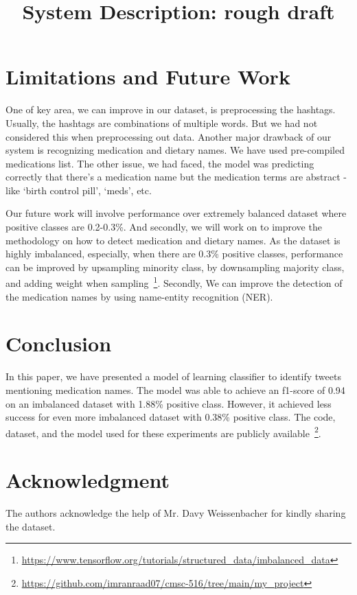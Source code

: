 \documentclass[12pt, onecolumn, conference]{IEEEtran}
\begin{document}
	
	\title{System Description: rough draft}
	
	\author{
	}
	
	\maketitle
	
	
	
	
	
	

	
		
	\section{Limitations and Future Work}
	One of key area, we can improve in our dataset, is preprocessing the hashtags. Usually, the hashtags are combinations of multiple words. But we had not considered this when preprocessing out data. Another major drawback of our system is recognizing medication and dietary names. We have used pre-compiled medications list. The other issue, we had faced, the model was predicting correctly that there's a medication name but the medication terms are abstract - like `birth control pill', `meds', etc. 
	
	Our future work will involve performance over extremely balanced dataset where positive classes are 0.2-0.3\%. And secondly, we will work on to improve the methodology on how to detect medication and dietary names. As the dataset is highly imbalanced, especially, when there are 0.3\% positive classes, performance can be improved by upsampling minority class, by downsampling majority class, and adding weight when sampling~\footnote{\url{https://www.tensorflow.org/tutorials/structured_data/imbalanced_data}}. Secondly,	We can improve the detection of the medication names by using name-entity recognition (NER).
	
	\section{Conclusion}
	In this paper, we have presented a model of learning classifier to identify tweets mentioning medication names. The model was able to achieve an f1-score of 0.94 on an imbalanced dataset with 1.88\% positive class. However, it achieved less success for even more imbalanced dataset with 0.38\% positive class. The code, dataset, and the model used for these experiments are publicly available~\footnote{\url{https://github.com/imranraad07/cmsc-516/tree/main/my_project}}.

	\section{Acknowledgment}
	The authors acknowledge the help of Mr. Davy Weissenbacher for kindly sharing the dataset.

	
	
	
\end{document}
